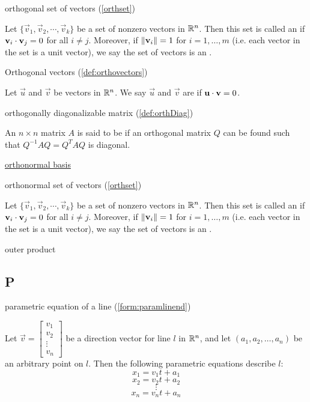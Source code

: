 \documentclass{ximera}
\begin{document}
orthogonal set of vectors (\ref{orthset})
\begin{expandable}
    Let $\{ \vec{v}_1, \vec{v}_2, \cdots, \vec{v}_k \}$ be a set of nonzero
vectors in $\mathbb{R}^n$. Then this set is called an
 if 
$\mathbf{v}_i \cdot \mathbf{v}_j = 0$ for all $i \neq j$.
Moreover, if $\left\lVert\mathbf{v}_i\right\rVert=1$ for $i=1,\ldots,m$ (i.e. each vector in the set is a unit vector), we say the set of vectors is an .
\end{expandable}

Orthogonal vectors (\ref{def:orthovectors}) 
\begin{expandable}
Let $\vec{u}$ and $\vec{v}$ be vectors in $\mathbb{R}^n$. We say $\vec{u}$ and $\vec{v}$ are  if $\mathbf{u}\cdot \mathbf{v}=0$.
\end{expandable}


orthogonally diagonalizable matrix (\ref{def:orthDiag})
\begin{expandable}
    An $n \times n$ matrix $A$ is said to be  if an orthogonal matrix $Q$ can be found such that  $Q^{-1}AQ = Q^{T}AQ$ is diagonal.
\end{expandable}

\href{https://ximera.osu.edu/oerlinalg/LinearAlgebra/RTH-0010/main}{orthonormal basis}

orthonormal set of vectors (\ref{orthset})
\begin{expandable}
    Let $\{ \vec{v}_1, \vec{v}_2, \cdots, \vec{v}_k \}$ be a set of nonzero
vectors in $\mathbb{R}^n$. Then this set is called an
 if 
$\mathbf{v}_i \cdot \mathbf{v}_j = 0$ for all $i \neq j$.
Moreover, if $\left\lVert\mathbf{v}_i\right\rVert=1$ for $i=1,\ldots,m$ (i.e. each vector in the set is a unit vector), we say the set of vectors is an .
\end{expandable}

outer product



\subsection{P}



parametric equation of a line (\ref{form:paramlinend})
\begin{expandable}
    Let $\vec{v}=\begin{bmatrix}v_1\\v_2\\\vdots\\v_n\end{bmatrix}$ be a direction vector for line $l$ in $\mathbb{R}^n$, and let $(a_1, a_2,\ldots , a_n)$ be an arbitrary point on $l$.  Then the following parametric equations describe $l$:
\[
x_1=v_1t+a_1\]
\[x_2=v_2t+a_2\]
\[\vdots\]
\[x_n=v_nt+a_n
\]
\end{expandable}
\end{document}
